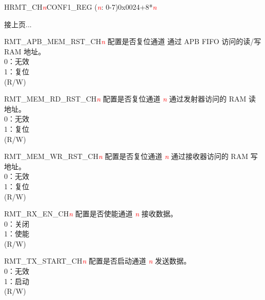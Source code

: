 \begin{register}{H}{RMT\_CH\textcolor{red}{\it{n}}CONF1\_REG (\textcolor{red}{\it{n}}: 0-7)}{0x0024+8*\textcolor{red}{\it{n}}}
\begin{regdesc}\begin{reglist}
\item [接上页...]

\item [RMT\_APB\_MEM\_RST\_CH\textcolor{red}{\it{n}}] 配置是否复位通道  通过 APB FIFO 访问的读/写 RAM 地址。\\
0：无效\\
1：复位\\(R/W)
\item [RMT\_MEM\_RD\_RST\_CH\textcolor{red}{\it{n}}] 配置是否复位通道 \textcolor{red}{\it{n}} 通过发射器访问的 RAM 读地址。\\
0：无效\\
1：复位\\(R/W)
\item [RMT\_MEM\_WR\_RST\_CH\textcolor{red}{\it{n}}] 配置是否复位通道 \textcolor{red}{\it{n}} 通过接收器访问的 RAM 写地址。\\
0：无效\\
1：复位\\(R/W)
\item [RMT\_RX\_EN\_CH\textcolor{red}{\it{n}}] 配置是否使能通道 \textcolor{red}{\it{n}} 接收数据。\\
0：关闭\\
1：使能\\(R/W)
\item [RMT\_TX\_START\_CH\textcolor{red}{\it{n}}] 配置是否启动通道 \textcolor{red}{\it{n}} 发送数据。\\
0：无效\\
1：启动\\(R/W)
\end{reglist}\end{regdesc}
\end{register}


